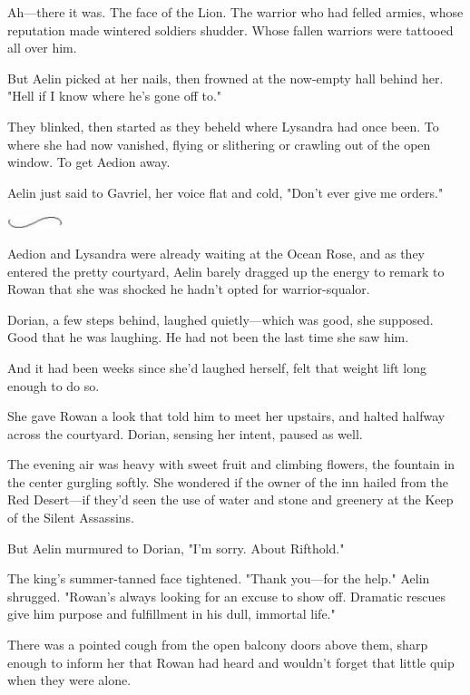 Ah---there it was.
The face of the Lion.
The warrior who had felled armies, whose reputation made wintered soldiers shudder.
Whose fallen warriors were tattooed all over him.

But Aelin picked at her nails, then frowned at the now-empty hall behind her.
"Hell if I know where he's gone off to."

They blinked, then started as they beheld where Lysandra had once been.
To where she had now vanished, flying or slithering or crawling out of the open window.
To get Aedion away.

Aelin just said to Gavriel, her voice flat and cold, "Don't ever give me orders."

\begin{center}
	\includegraphics[width=0.65in,height=0.13in]{images/seperator}
\end{center}

Aedion and Lysandra were already waiting at the Ocean Rose, and as they entered the pretty courtyard, Aelin barely dragged up the energy to remark to Rowan that she was shocked he hadn't opted for warrior-squalor.

Dorian, a few steps behind, laughed quietly---which was good, she supposed.
Good that he was laughing.
He had not been the last time she saw him.

And it had been weeks since she'd laughed herself, felt that weight lift long enough to do so.

She gave Rowan a look that told him to meet her upstairs, and halted halfway across the courtyard.
Dorian, sensing her intent, paused as well.

The evening air was heavy with sweet fruit and climbing flowers, the fountain in the center gurgling softly.
She wondered if the owner of the inn hailed from the Red Desert---if they'd seen the use of water and stone and greenery at the Keep of the Silent Assassins.

But Aelin murmured to Dorian, "I'm sorry.
About Rifthold."

The king's summer-tanned face tightened.
"Thank you---for the help."
Aelin shrugged.
"Rowan's always looking for an excuse to show off.
Dramatic rescues give him purpose and fulfillment in his dull, immortal life."

There was a pointed cough from the open balcony doors above them, sharp enough to inform her that Rowan had heard and wouldn't forget that little quip when they were alone.

